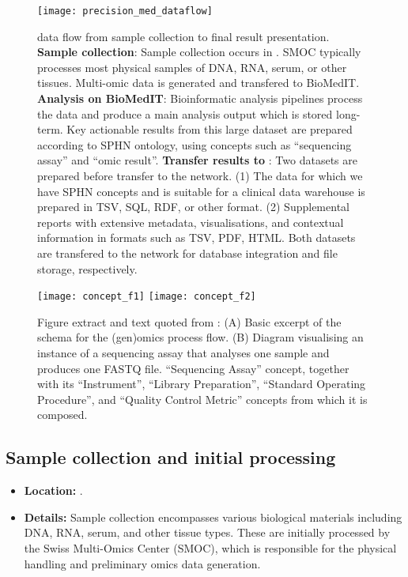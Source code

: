 \begin{figure}[h] \hspace*{0cm} 
\begin{center}
	\texttt{[image: precision\_med\_dataflow]}
	\caption{\pmu data flow from sample collection to final result presentation. \textbf{Sample collection}: Sample collection occurs in \kispi. SMOC typically processes most physical samples of DNA, RNA, serum, or other tissues. Multi-omic data is generated and transfered to BioMedIT. \textbf{Analysis on BioMedIT}: Bioinformatic analysis pipelines process the data and produce a main analysis output which is stored long-term. 
	Key actionable results from this large dataset are prepared according to SPHN ontology, using concepts such as ``sequencing assay'' and ``omic result''. 
	\textbf{Transfer results to \kispi}:
	Two datasets are prepared before transfer to the \kispi network. (1) The data for which we have SPHN concepts and is suitable for a clinical data warehouse is prepared in TSV, SQL, RDF, or other format. (2) Supplemental reports with extensive metadata, visualisations, and contextual information in formats such as TSV, PDF, HTML. Both datasets are transfered to the \kispi network for database integration and file storage, respectively.}
	\label{fig:precision_med_dataflow}
\end{center}
\end{figure}

\begin{figure}[h] \hspace*{0cm} 
\begin{center}
	\texttt{[image: concept\_f1]}
	\texttt{[image: concept\_f2]}
	\caption{Figure extract and text quoted from \citet{van2023bridging}: (A) Basic excerpt of the schema for the (gen)omics process flow. (B) Diagram visualising an instance of a sequencing assay that analyses one sample and produces one FASTQ file. ``Sequencing Assay'' concept, together with its ``Instrument'', ``Library Preparation'', ``Standard Operating Procedure'', and ``Quality Control Metric'' concepts from which it is composed.}
	\label{fig:concept}
\end{center}
\end{figure}
\clearpage

\subsection{Sample collection and initial processing}
\begin{itemize}
    \item \textbf{Location:} \kispi.
    \item \textbf{Details:} Sample collection encompasses various biological materials including DNA, RNA, serum, and other tissue types. These are initially processed by the Swiss Multi-Omics Center (SMOC), which is responsible for the physical handling and preliminary omics data generation.
\end{itemize}

